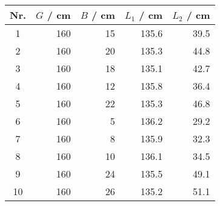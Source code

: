 \begin{tabular}{c|rrrr}
Nr. & $G$ / cm & $B$ / cm & $L_1$ / cm & $L_2$ / cm \\
\hline
1 & 160 & 15 & 135.6 & 39.5\\
2 & 160 & 20 & 135.3 & 44.8\\
3 & 160 & 18 & 135.1 & 42.7\\
4 & 160 & 12 & 135.8 & 36.4\\
5 & 160 & 22 & 135.3 & 46.8\\
6 & 160 & 5 & 136.2 & 29.2\\
7 & 160 & 8 & 135.9 & 32.3\\
8 & 160 & 10 & 136.1 & 34.5\\
9 & 160 & 24 & 135.5 & 49.1\\
10 & 160 & 26 & 135.2 & 51.1
\end{tabular}
